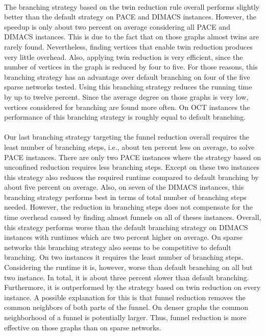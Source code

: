 \documentclass[12pt,a4paper,twoside]{scrartcl}
\numberwithin{equation}{section}
\begin{document}
\paragraph{}
The branching strategy based on the twin reduction rule overall performs slightly better than the default strategy on PACE and DIMACS instances. However, the speedup is only about two percent on average considering all PACE and DIMACS instances. This is due to the fact that on those graphs almost twins are rarely found. Nevertheless, finding vertices that enable twin reduction produces very little overhead. Also, applying twin reduction is very efficient, since the number of vertices in the graph is reduced by four to five. For those reasons, this branching strategy has an advantage over default branching on four of the five sparse networks tested. Using this branching strategy reduces the running time by up to twelve percent. Since the average degree on those graphs is very low, vertices considered for branching are found more often. On OCT instances the performance of this branching strategy is roughly equal to default branching.
\paragraph{}
Our last branching strategy targeting the funnel reduction overall requires the least number of branching steps, i.e., about ten percent less on average, to solve PACE instances. There are only two PACE instances where the strategy based on unconfined reduction requires less branching steps. Except on these two instances this strategy also reduces the required runtime compared to default branching by about five percent on average. Also, on seven of the DIMACS instances, this branching strategy performs best in terms of total number of branching steps needed. However, the reduction in branching steps does not compensate for the time overhead caused by finding almost funnels on all of theses instances. Overall, this strategy performs worse than the default branching strategy on DIMACS instances with runtimes which are two percent higher on average. On sparse networks this branching strategy also seems to be competitive to default branching. On two instances it requires the least number of branching steps. Considering the runtime it is, however, worse than default branching on all but two instance. In total, it is about three percent slower than default branching. Furthermore, it is outperformed by the strategy based on twin reduction on every instance. A possible explanation for this is that funnel reduction removes the common neighbors of both parts of the funnel. On denser graphs the common neighborhood of a funnel is potentially larger. Thus, funnel reduction is more effective on those graphs than on sparse networks.
\end{document}
